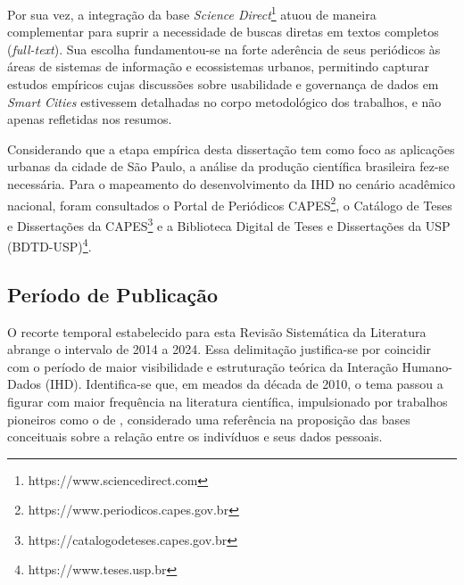 \documentclass[
	12pt,				%
	oneside,			%
	a4paper,			%
	english,			%
	brazil				%
	]{abntex2ppgsi}
\begin{document}
    Por sua vez, a integração da base \emph{Science Direct}\footnote{https://www.sciencedirect.com} atuou de maneira complementar para suprir a necessidade de buscas diretas em textos completos (\textit{full-text}). Sua escolha fundamentou-se na forte aderência de seus periódicos às áreas de sistemas de informação e ecossistemas urbanos, permitindo capturar estudos empíricos cujas discussões sobre usabilidade e governança de dados em \textit{Smart Cities} estivessem detalhadas no corpo metodológico dos trabalhos, e não apenas refletidas nos resumos.

    Considerando que a etapa empírica desta dissertação tem como foco as aplicações urbanas da cidade de São Paulo, a análise da produção científica brasileira fez-se necessária. Para o mapeamento do desenvolvimento da IHD no cenário acadêmico nacional, foram consultados o Portal de Periódicos CAPES\footnote{https://www.periodicos.capes.gov.br}, o Catálogo de Teses e Dissertações da CAPES\footnote{https://catalogodeteses.capes.gov.br} e a Biblioteca Digital de Teses e Dissertações da USP (BDTD-USP)\footnote{https://www.teses.usp.br}.
    



\subsection{Período de Publicação}


    O recorte temporal estabelecido para esta Revisão Sistemática da Literatura abrange o intervalo de 2014 a 2024. Essa delimitação justifica-se por coincidir com o período de maior visibilidade e estruturação teórica da Interação Humano-Dados (IHD). Identifica-se que, em meados da década de 2010, o tema passou a figurar com maior frequência na literatura científica, impulsionado por trabalhos pioneiros como o de , considerado uma referência na proposição das bases conceituais sobre a relação entre os indivíduos e seus dados pessoais.
\end{document}
